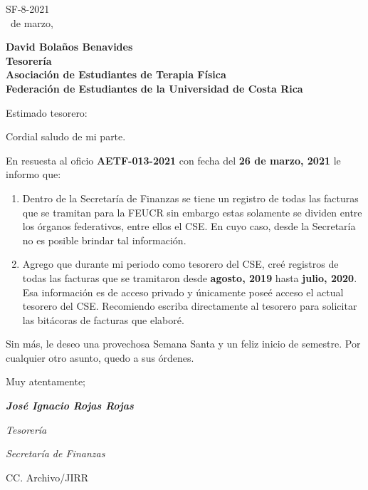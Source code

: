 \documentclass[12pt]{article}
\begin{document}
\begin{flushright}
  SF-8-2021\\
   \ de marzo, \the\year
\end{flushright}
\medskip
\begin{flushleft}\begin{spacing}{1}
  \textbf{David Bola\~nos Benavides\\
  Tesorería\\
  Asociaci\'on de Estudiantes de Terapia F\'isica\\
  Federación de Estudiantes de la Universidad de Costa Rica}
\end{spacing}\end{flushleft}

\noindent Estimado tesorero:\par
Cordial saludo de mi parte.\par
En resuesta al oficio \textbf{AETF-013-2021} con fecha del \textbf{26 de marzo, 2021} le informo que:
\begin{enumerate}
    \item Dentro de la Secretar\'ia de Finanzas se tiene un registro de todas las facturas que se tramitan para la FEUCR sin embargo estas solamente se dividen entre los \'organos federativos, entre ellos el CSE. En cuyo caso, desde la Secretar\'ia no es posible brindar tal informaci\'on.
    \item Agrego que durante mi periodo como tesorero del CSE, cre\'e registros de todas las facturas que se tramitaron desde \textbf{agosto, 2019} hasta \textbf{julio, 2020}. Esa informaci\'on es de acceso privado y \'unicamente pose\'e acceso el actual tesorero del CSE. Recomiendo escriba directamente al tesorero para solicitar las bit\'acoras de facturas que elabor\'e. 
\end{enumerate}
Sin más, le deseo una provechosa Semana Santa y un feliz inicio de semestre. Por cualquier otro asunto, quedo a sus \'ordenes.\par
Muy atentamente;\par
\bigskip
\bigskip
\bigskip
\begin{spacing}{1}
\textit{\textbf{Jos\'e Ignacio Rojas Rojas}}\par
\textit{Tesorer\'ia}\par 
\textit{Secretar\'ia de Finanzas}
\end{spacing}
\medskip
\begin{flushleft}\begin{spacing}{1}
 \scriptsize{CC. Archivo/JIRR

 }
\end{spacing}\end{flushleft}
%
%
\end{document}
